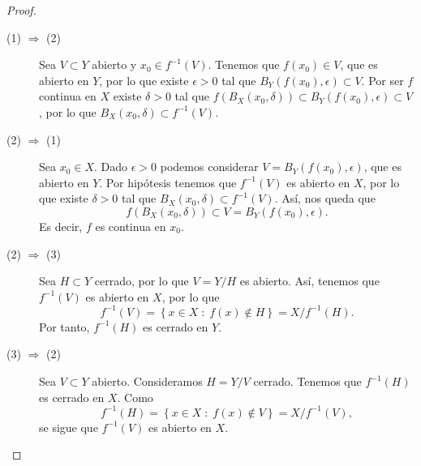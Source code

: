 \begin{proof}
\begin{description}
\item[(1) $\displaystyle \Rightarrow $ (2)] Sea $\displaystyle V \subset Y$ abierto y $\displaystyle x_{0} \in f^{-1}\left(V\right) $. Tenemos que $\displaystyle f\left(x_{0}\right) \in V $, que es abierto en $\displaystyle Y $, por lo que existe $\displaystyle \epsilon > 0 $ tal que $\displaystyle B _{Y}\left(f\left(x_{0}\right), \epsilon \right) \subset V $. 
Por ser $\displaystyle f $ continua en $\displaystyle X $ existe $\displaystyle \delta > 0 $ tal que $\displaystyle f\left(B _{X}\left(x_{0}, \delta \right)\right) \subset B_{Y}\left(f\left(x_{0}\right), \epsilon \right) \subset V $, por lo que $\displaystyle B_{X}\left(x_{0}, \delta \right)\subset f^{-1}\left(V\right) $.
\item[(2) $\displaystyle \Rightarrow $ (1)] Sea $\displaystyle x_{0} \in X $. Dado $\displaystyle \epsilon > 0 $ podemos considerar $\displaystyle V =  B_{Y}\left(f\left(x_{0}\right), \epsilon \right)$, que es abierto en $\displaystyle Y $. Por hipótesis tenemos que $\displaystyle f^{-1}\left(V\right) $ es abierto en $\displaystyle X $, por lo que existe $\displaystyle \delta > 0 $ tal que $\displaystyle B_{X}\left(x_{0}, \delta \right) \subset f^{-1}\left(V\right) $. Así, nos queda que 
	\[f\left(B_{X}\left(x_{0}, \delta \right)\right) \subset V = B_{Y}\left(f\left(x_{0}\right), \epsilon \right) .\]
	Es decir, $\displaystyle f $ es continua en $\displaystyle x_{0} $. 
\item[(2) $\displaystyle  \Rightarrow $ (3)] Sea $\displaystyle H \subset Y $ cerrado, por lo que $\displaystyle V = Y / H $ es abierto. Así, tenemos que $\displaystyle f^{-1}\left(V\right) $ es abierto en $\displaystyle X $, por lo que
	\[f^{-1}\left(V\right) = \left\{ x \in X \; : \; f\left(x\right) \not\in H\right\} = X / f^{-1}\left(H\right) .\]
	Por tanto, $\displaystyle f^{-1}\left(H\right) $ es cerrado en $\displaystyle Y $.
\item[(3) $\displaystyle  \Rightarrow $ (2)] Sea $\displaystyle V \subset Y $ abierto. Consideramos $\displaystyle H = Y / V $ cerrado. Tenemos que $\displaystyle f^{-1}\left(H\right) $ es cerrado en $\displaystyle X $. Como  
	\[f^{-1}\left(H\right) = \left\{ x \in X \; : \; f\left(x\right) \not\in V\right\}  = X / f^{-1}\left(V\right) ,\]
	se sigue que $\displaystyle f^{-1}\left(V\right) $ es abierto en $\displaystyle X $.
\end{description}
\end{proof}
